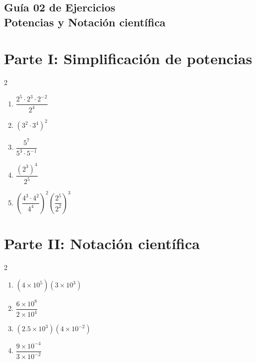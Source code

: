 \documentclass[12pt]{article}
\begin{document}
	
	\vspace*{2em}
	
	\begin{center}
		\section*{\textbf{Guía 02 de Ejercicios}\\
			\small Potencias y Notación científica}
	\end{center}
	
	\vspace{1em}
	
	\section*{Parte I: Simplificación de potencias}
	
	\begin{multicols}{2}
	
	\begin{enumerate}
		
		\item
		$\dfrac{2^5 \cdot 2^3 \cdot 2^{-2}}{2^4}$
		
		\item
		$(3^2 \cdot 3^4)^2$
		
		\item
		$\dfrac{5^7}{5^3 \cdot 5^{-1}}$
		
		\item
		$\dfrac{(2^3)^4}{2^5}$
		
		\item
		$\left(\dfrac{4^3 \cdot 4^2}{4^4}\right)^2
		\left(\dfrac{2^5}{2^2}\right)^3$
		
	\end{enumerate}
	
\end{multicols}
	
	\section*{Parte II: Notación científica}
	
	\begin{multicols}{2}
	
	\begin{enumerate}
		
		\item
		$(4\times10^5)(3\times10^3)$
		
		\item
		$\dfrac{6\times10^8}{2\times10^4}$
		
		\item
		$(2.5\times10^3)(4\times10^{-2})$
		
		\item $\dfrac{9\times10^{-4}}{3\times10^{-2}}$
		
								
	\end{enumerate}
	
\end{multicols}
\end{document}

